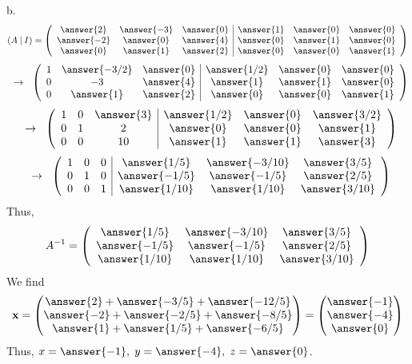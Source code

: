 \documentclass{ximera}
\begin{document}
\begin{exercise}
\begin{prompt}
b.
\[ (A \hspace{.08cm} | \hspace{.08cm} I) = \left(\begin{array}{ccc|ccc}
  \answer{2} & \answer{-3} & \answer{0} &  \answer{1} & \answer{0} & \answer{0}  \\
  \answer{-2} & \answer{0} & \answer{4} & \answer{0} & \answer{1} & \answer{0}\\
  \answer{0} & \answer{1} & \answer{2} &\answer{0} & \answer{0} & \answer{1}
\end{array}\right)
\]
\[
\hspace{.2cm} \rightarrow \hspace{.2cm}
\left(\begin{array}{ccc|ccc}
  1 & \answer{-3/2} & \answer{0} &  \answer{1/2} & \answer{0} & \answer{0}  \\
  0 & -3 & \answer{4} & \answer{1} & \answer{1} & \answer{0}\\
  0 & \answer{1} & \answer{2} &\answer{0} & \answer{0} & \answer{1}
\end{array}\right)
\]
\[
\hspace{.2cm} \rightarrow \hspace{.2cm}
\left(\begin{array}{ccc|ccc}
  1 & 0 & \answer{3} &  \answer{1/2} & \answer{0} & \answer{3/2}  \\
  0 & 1 & 2 & \answer{0} & \answer{0} & \answer{1}\\
  0 & 0 & 10 &\answer{1} & \answer{1} & \answer{3}
\end{array}\right)
\]
\[
\hspace{.2cm} \rightarrow \hspace{.2cm}
\left(\begin{array}{ccc|ccc}
  1 & 0 & 0 &  \answer{1/5} & \answer{-3/10} & \answer{3/5}  \\
  0 & 1 & 0 & \answer{-1/5} & \answer{-1/5} & \answer{2/5}\\
  0 & 0 &1 &\answer{1/10} & \answer{1/10} & \answer{3/10}
\end{array}\right)
\]
Thus,
\[
A^{-1} = \left(\begin{array}{ccc}
  \answer{1/5} & \answer{-3/10} & \answer{3/5}  \\
  \answer{-1/5} & \answer{-1/5} & \answer{2/5}  \\
  \answer{1/10} & \answer{1/10} & \answer{3/10}
\end{array}\right)
\]
We find
\[\textbf{x} = \begin{pmatrix}
\answer{2}+\answer{-3/5} + \answer{-12/5}\\
\answer{-2}+\answer{-2/5} + \answer{-8/5}\\
\answer{1}+\answer{1/5} + \answer{-6/5}
\end{pmatrix}= \begin{pmatrix}
\answer{-1}\\
\answer{-4}\\
\answer{0}
\end{pmatrix}
\]
Thus, $x= \answer{-1}, \hspace{.1cm} y= \answer{-4},\hspace{.1cm} z= \answer{0}$.
\end{prompt}
\end{exercise}
\end{document}
